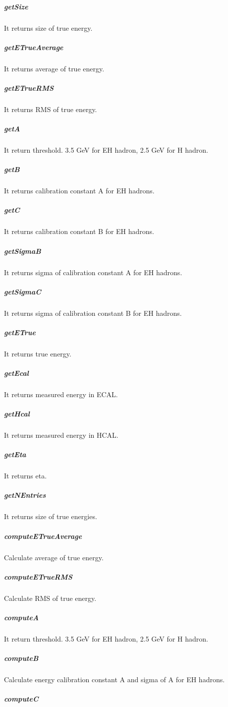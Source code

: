 \documentclass{cernrep}
\begin{document}
\subparagraph{getSize}

It returns size of true energy.

\subparagraph{getETrueAverage}

It returns average of true energy.

\subparagraph{getETrueRMS}

It returns RMS of true energy.

\subparagraph{getA}

It return threshold. 3.5 GeV for EH hadron, 2.5 GeV for H hadron.

\subparagraph{getB}

It returns calibration constant A for EH hadrons.

\subparagraph{getC}

It returns calibration constant B for EH hadrons.

\subparagraph{getSigmaB}

It returns sigma of calibration constant A for EH hadrons.

\subparagraph{getSigmaC}

It returns sigma of calibration constant B for EH hadrons.

\subparagraph{getETrue}

It returns true energy.

\subparagraph{getEcal}

It returns measured energy in ECAL.

\subparagraph{getHcal}

It returns measured energy in HCAL.

\subparagraph{getEta}

It returns eta.

\subparagraph{getNEntries}

It returns size of true energies.

\subparagraph{computeETrueAverage}

Calculate average of true energy.

\subparagraph{computeETrueRMS}

Calculate RMS of true energy.

\subparagraph{computeA}

It return threshold. 3.5 GeV for EH hadron, 2.5 GeV for H hadron.

\subparagraph{computeB}

Calculate energy calibration constant A and sigma of A for EH hadrons.

\subparagraph{computeC}
\end{document}
